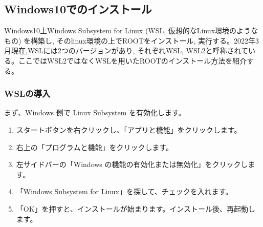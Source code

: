 \subsection{Windows10でのインストール}
Windows10上Windows Subsystem for Linux (WSL, 仮想的なLinux環境のようなもの) を構築し, そのlinux環境の上でROOTをインストール, 実行する。2022年3月現在,WSLには2つのバージョンがあり, それぞれWSL, WSL2と呼称されている。ここではWSL2ではなくWSLを用いたROOTのインストール方法を紹介する。

\subsubsection{WSLの導入}
まず、Windows 側で Linux Subsystem を有効化します。
\begin{enumerate}
    \item スタートボタンを右クリックし、「アプリと機能」をクリックします。
    \item 右上の「プログラムと機能」をクリックします。
    \item 左サイドバーの「Windows の機能の有効化または無効化」をクリックします。
    \item 「Windows Subsystem for Linux」を探して、チェックを入れます。
    \item 「OK」を押すと、インストールが始まります。インストール後、再起動します。
\end{enumerate}

